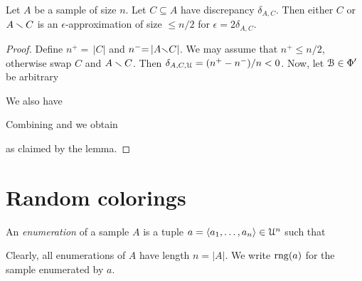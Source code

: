 \documentclass[sputnik.tex]{subfiles}
\begin{document}
\begin{lemma}\label{lem_aprossimazionediapprossimazione}
Let $A$ be a sample of size $n$.
Let $C\subseteq A$ have discrepancy $\delta_{A,C}$.
Then either $C$ or $A\smallsetminus C$ is an $\epsilon$-approximation of size $\le n/2$ for $\epsilon=2\delta_{A,C}$.
\end{lemma}

\begin{proof}

Define $n^+{=}\,|C|$ and  $n^-{=}\,|A{\smallsetminus}C|$.
We may assume that $n^+\le n/2$, otherwise swap $C$ and $A\smallsetminus C$.
Then $\delta_{A,C,\EuScript U}=(n^+-n^-)/n<0$. Now, let $\EuScript B\in\Phi'$ be arbitrary




We also have 



Combining  and  we obtain\smallskip


\smallskip

as claimed by the lemma.
\end{proof}


\section{Random colorings}

An \emph{enumeration\/} of a sample $A$ is a tuple $a=\langle a_1,\dots,a_n\rangle\in\EuScript U^n$ such that


Clearly, all enumerations of $A$ have length $n=|A|$. We write \emph{$\mathop{\rm rng}(a)$} for the sample enumerated by $a$.
\end{document}
